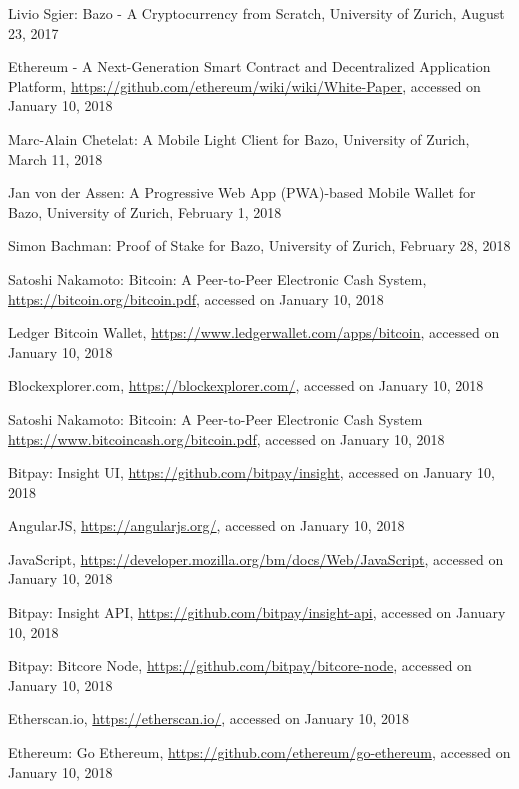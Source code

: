 \begin{thebibliography}{99}

 Livio Sgier: Bazo - A Cryptocurrency from Scratch, University of Zurich, August 23, 2017

 Ethereum - A Next-Generation Smart Contract and Decentralized Application Platform, \url{https://github.com/ethereum/wiki/wiki/White-Paper}, accessed on January 10, 2018

 Marc-Alain Chetelat: A Mobile Light Client for Bazo, University of Zurich, March 11, 2018

 Jan von der Assen: A Progressive Web App (PWA)-based Mobile Wallet for Bazo, University of Zurich, February 1, 2018

 Simon Bachman: Proof of Stake for Bazo, University of Zurich, February 28, 2018

 Satoshi Nakamoto: Bitcoin: A Peer-to-Peer Electronic Cash System, \url{https://bitcoin.org/bitcoin.pdf}, accessed on January 10, 2018

 Ledger Bitcoin Wallet, \url{https://www.ledgerwallet.com/apps/bitcoin}, accessed on January 10, 2018

 Blockexplorer.com, \url{https://blockexplorer.com/}, accessed on January 10, 2018

 Satoshi Nakamoto: Bitcoin: A Peer-to-Peer Electronic Cash System \url{https://www.bitcoincash.org/bitcoin.pdf}, accessed on January 10, 2018

 Bitpay: Insight UI, \url{https://github.com/bitpay/insight}, accessed on January 10, 2018

 AngularJS, \url{https://angularjs.org/}, accessed on January 10, 2018

 JavaScript, \url{https://developer.mozilla.org/bm/docs/Web/JavaScript}, accessed on January 10, 2018

 Bitpay: Insight API, \url{https://github.com/bitpay/insight-api}, accessed on January 10, 2018

 Bitpay: Bitcore Node, \url{https://github.com/bitpay/bitcore-node}, accessed on January 10, 2018

 Etherscan.io, \url{https://etherscan.io/}, accessed on January 10, 2018

 Ethereum: Go Ethereum, \url{https://github.com/ethereum/go-ethereum}, accessed on January 10, 2018


\end{thebibliography}

